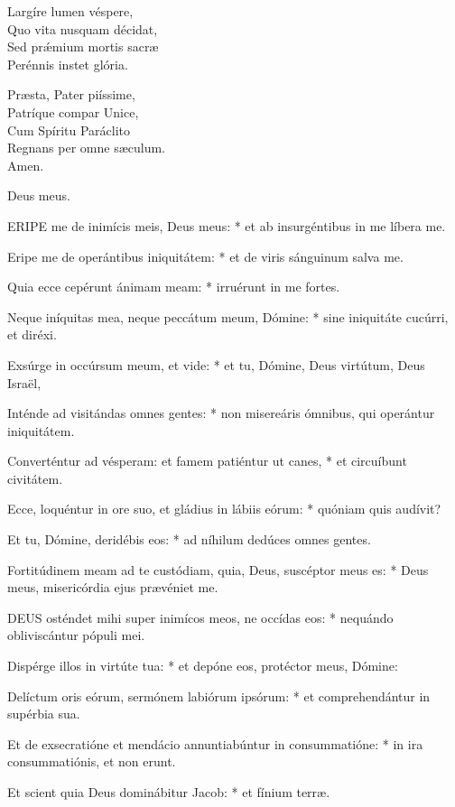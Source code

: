 Largíre lumen véspere,\\
Quo vita nusquam décidat,\\
Sed prǽmium mortis sacræ\\
Perénnis instet glória.

Præsta, Pater piíssime,\\
Patríque compar Unice,\\
Cum Spíritu Paráclito\\
Regnans per omne sæculum.\\
Amen.

 Deus meus.


\lettrine[lines=2]{E}{RIPE} me de inimícis meis, Deus meus: * et ab insurgéntibus in me líbera me.

Eripe me de operántibus iniquitátem: * et de viris sánguinum salva me.

Quia ecce cepérunt ánimam meam: * irruérunt in me fortes.

Neque iníquitas mea, neque peccátum meum, Dómine: * sine iniquitáte cucúrri, et diréxi.

Exsúrge in occúrsum meum, et vide: * et tu, Dómine, Deus virtútum, Deus Israël,

Inténde ad visitándas omnes gentes: * non misereáris ómnibus, qui operántur iniquitátem.

Converténtur ad vésperam: et famem patiéntur ut canes, * et circuíbunt civitátem.

Ecce, loquéntur in ore suo, et gládius in lábiis eórum: * quóniam quis audívit?

Et tu, Dómine, deridébis eos: * ad níhilum dedúces omnes gentes.

Fortitúdinem meam ad te custódiam, quia, Deus, suscéptor meus es: * Deus meus, misericórdia ejus prævéniet me.


\lettrine[lines=2]{D}{EUS} osténdet mihi super inimícos meos, ne occídas eos: * nequándo obliviscántur pópuli mei.

Dispérge illos in virtúte tua: * et depóne eos, protéctor meus, Dómine:

Delíctum oris eórum, sermónem labiórum ipsórum: * et comprehendántur in supérbia sua.

Et de exsecratióne et mendácio annuntiabúntur in consummatióne: * in ira consummatiónis, et non erunt.

Et scient quia Deus dominábitur Jacob: * et fínium terræ.

